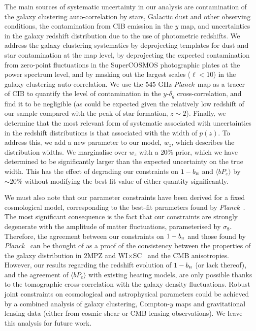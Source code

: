 \documentclass[useAMS,usenatbib]{mn2e}
\newcommand{\wisc}{WI$\times$SC}
\def\bH{b_{\scriptscriptstyle\rm H}}
\def\planck{{\it Planck\/}}
\begin{document}
  The main sources of systematic uncertainty in our analysis are contamination of the galaxy clustering auto-correlation by stars, Galactic dust and other observing conditions, the contamination from CIB emission in the $y$ map, and uncertainties in the galaxy redshift distribution due to the use of photometric redshifts. We address the galaxy clustering systematics by deprojecting templates for dust and star contamination at the map level, by deprojecting the expected contamination from zero-point fluctuations in the SuperCOSMOS photographic plates at the power spectrum level, and by masking out the largest scales ($\ell<10$) in the galaxy clustering auto-correlation. We use the 545 GHz \planck\ map as a tracer of CIB to quantify the level of contamination in the $y$-$\delta_g$ cross-correlation, and find it to be negligible (as could be expected given the relatively low redshift of our sample compared with the peak of star formation, $z\sim2$). Finally, we determine that the most relevant form of systematic associated with uncertainties in the redshift distributions is that associated with the width of $p(z)$. To address this, we add a new parameter to our model, $w_z$, which describes the distribution widths. We marginalise over $w_z$ with a 20\% prior, which we have determined to be significantly larger than the expected uncertainty on the true width. This has the effect of degrading our constraints on $1-\bH$ and $\langle bP_e\rangle$ by $\sim20\%$ without modifying the best-fit value of either quantity significantly.
  
  We must also note that our parameter constraints have been derived for a fixed cosmological model, corresponding to the best-fit parameters found by \planck\ \citep{2018arXiv180706209P}. The most significant consequence is the fact that our constraints are strongly degenerate with the amplitude of matter fluctuations, parameterised by $\sigma_8$. Therefore, the agreement between our constraints on $1-\bH$ and those found by \planck\ \citep{2016A&A...594A..24P} can be thought of as a proof of the consistency between the properties of the galaxy distribution in 2MPZ and \wisc~ and the CMB anisotropies. However, our results regarding the redshift evolution of $1-\bH$ (or lack thereof), and the agreement of $\langle bP_e\rangle$ with existing heating models, are only possible thanks to the tomographic cross-correlation with the galaxy density fluctuations. Robust joint constraints on cosmological and astrophysical parameters could be achieved by a combined analysis of galaxy clustering, Compton-$y$ maps and gravitational lensing data (either from cosmic shear or CMB lensing observations). We leave this analysis for future work.
  
\end{document}
